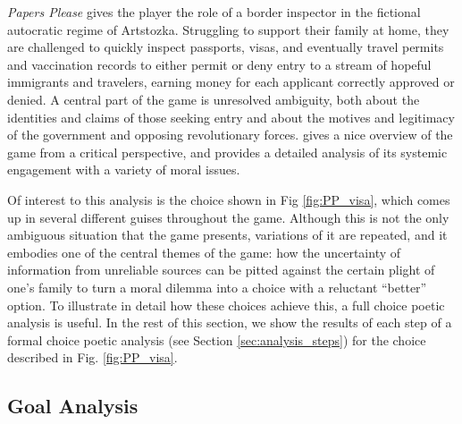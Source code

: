 \documentclass[arts,article,submit,moreauthors,pdftex,10pt,a4paper]{Definitions/mdpi}
\begin{document}
\emph{Papers Please} \citep{pope2013papers} gives the player the role of a border inspector in the fictional autocratic regime of Artstozka.
%
Struggling to support their family at home, they are challenged to quickly inspect passports, visas, and eventually travel permits and vaccination records to either permit or deny entry to a stream of hopeful immigrants and travelers, earning money for each applicant correctly approved or denied.
%
A central part of the game is unresolved ambiguity, both about the identities and claims of those seeking entry and about the motives and legitimacy of the government and opposing revolutionary forces.
%
\cite{alexander2013designing} gives a nice overview of the game from a critical perspective, and \cite{formosa2016papers} provides a detailed analysis of its systemic engagement with a variety of moral issues.


Of interest to this analysis is the choice shown in Fig \ref{fig:PP_visa}, which comes up in several different guises throughout the game.
%
Although this is not the only ambiguous situation that the game presents, variations of it are repeated, and it embodies one of the central themes of the game: how the uncertainty of information from unreliable sources can be pitted against the certain plight of one's family to turn a moral dilemma into a choice with a reluctant ``better'' option.
%
To illustrate in detail how these choices achieve this, a full choice poetic analysis is useful.
%
In the rest of this section, we show the results of each step of a formal choice poetic analysis (see Section \ref{sec:analysis_steps}) for the choice described in Fig. \ref{fig:PP_visa}.

\subsection{Goal Analysis}
\end{document}
